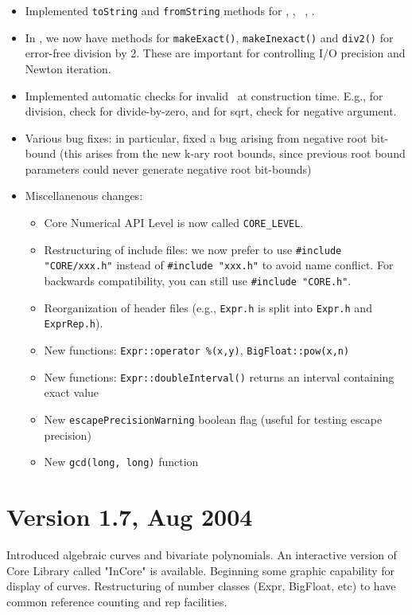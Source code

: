 \documentclass[12pt]{article}
\begin{document}
\begin{itemize}
	\item Implemented \texttt{toString} and \texttt{fromString} methods for 
		\Int, \Rat, \BF\, \real, \expr.
	\item In \BF, we now have methods for \texttt{makeExact()},
		\texttt{makeInexact()}
		and \texttt{div2()} for error-free division by 2.
		These are important for controlling I/O precision
		and Newton iteration.
	\item Implemented automatic checks for invalid \expr\ at 
		construction time.  E.g.,
		for division, check for divide-by-zero, and for sqrt,
		check for negative argument.
	\item Various bug fixes: in particular, fixed a
		bug arising from negative root bit-bound 
		(this arises from the new k-ary root bounds, since
		previous root bound parameters could never generate
		negative root bit-bounds)
	\item Miscellanenous changes:
	\begin{itemize}
		\item Core Numerical API Level is now called
		\texttt{CORE\_LEVEL}.
		\item Restructuring of include files:
		we now prefer to use \texttt{\#include "CORE/xxx.h"}
		  instead of \texttt{\#include "xxx.h"} to avoid name
		  conflict.   For backwards compatibility, you can
		  still use \texttt{\#include "CORE.h"}.
		\item Reorganization of header files (e.g.,
		\texttt{Expr.h} is split into \texttt{Expr.h}
		and \texttt{ExprRep.h}). 
		\item New functions: \texttt{Expr::operator \%(x,y)},
		\texttt{BigFloat::pow(x,n)}
		\item New functions: \texttt{Expr::doubleInterval()}
		returns an interval containing exact value
		\item New \texttt{escapePrecisionWarning} boolean flag
		(useful for testing escape precision)
		\item New \texttt{gcd(long, long)} function
	\end{itemize}
    \end{itemize}

\section{Version 1.7, Aug 2004}

Introduced algebraic curves and bivariate polynomials.
An interactive version of Core Library called "InCore" is available.
Beginning some graphic capability for display of curves.  Restructuring
of number classes (Expr, BigFloat, etc) to have common reference counting
and rep facilities.
\end{document}

